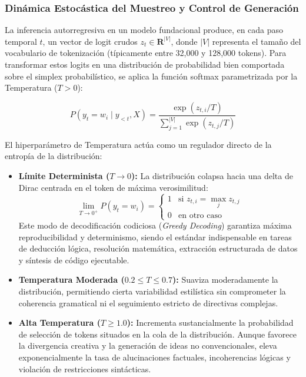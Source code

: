 \subsubsection{Dinámica Estocástica del Muestreo y Control de Generación}

La inferencia autorregresiva en un modelo fundacional produce, en cada paso temporal $t$, un vector de logit crudos $z_t \in \mathbf{R}^{|V|}$, donde $|V|$ representa el tamaño del vocabulario de tokenización (típicamente entre 32,000 y 128,000 tokens). Para transformar estos logits en una distribución de probabilidad bien comportada sobre el simplex probabilístico, se aplica la función softmax parametrizada por la Temperatura ($T > 0$):

\begin{equation}
P(y_t = w_i \mid y_{<t}, X) = \frac{\exp(z_{t, i} / T)}{\sum_{j=1}^{|V|} \exp(z_{t, j} / T)}
\end{equation}

El hiperparámetro de Temperatura actúa como un regulador directo de la entropía de la distribución:

\begin{itemize}
    \item \textbf{Límite Determinista ($T \to 0$):} La distribución colapsa hacia una delta de Dirac centrada en el token de máxima verosimilitud:
    \begin{equation}
    \lim_{T \to 0^+} P(y_t = w_i) = \begin{cases} 1 & \text{si } z_{t,i} = \max_j z_{t,j} \\ 0 & \text{en otro caso} \end{cases}
    \end{equation}
    Este modo de decodificación codiciosa (\textit{Greedy Decoding}) garantiza máxima reproducibilidad y determinismo, siendo el estándar indispensable en tareas de deducción lógica, resolución matemática, extracción estructurada de datos y síntesis de código ejecutable.
    \item \textbf{Temperatura Moderada ($0.2 \le T \le 0.7$):} Suaviza moderadamente la distribución, permitiendo cierta variabilidad estilística sin comprometer la coherencia gramatical ni el seguimiento estricto de directivas complejas.
    \item \textbf{Alta Temperatura ($T \ge 1.0$):} Incrementa sustancialmente la probabilidad de selección de tokens situados en la cola de la distribución. Aunque favorece la divergencia creativa y la generación de ideas no convencionales, eleva exponencialmente la tasa de alucinaciones factuales, incoherencias lógicas y violación de restricciones sintácticas.
\end{itemize}

